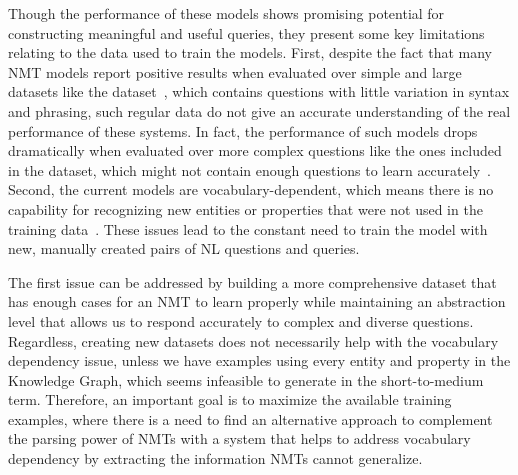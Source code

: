 Though the performance of these models shows promising potential for constructing meaningful 
and useful \SPARQL{} queries, they present some key limitations relating to the data 
used to train the models. First, despite the fact that many NMT models report positive results 
when evaluated over simple and large datasets like the \DBNQA{} dataset~\cite{nmt:nl-to-sparql-Yin19}, 
which contains questions with little variation in syntax and phrasing, such regular data do not give 
an accurate understanding of the real performance of these systems. In fact, the performance of such 
models drops dramatically when evaluated over more complex questions like the ones included in the 
\LCQuADone{} dataset, which might not contain enough questions to learn 
accurately~\cite{nmt:nl-to-sparql-Yin19}. Second, the current models are vocabulary-dependent, which 
means there is no capability for recognizing new entities or properties that were not used in the 
training data~\cite{nmt:nl-to-sparql-Yin19}. These issues lead to the constant need to train the model 
with new, manually created pairs of NL questions and \SPARQL{} queries.

The first issue can be addressed by building a more comprehensive dataset that has enough 
cases for an NMT to learn properly while maintaining an abstraction level that allows us to 
respond accurately to complex and diverse questions. Regardless, creating new datasets does 
not necessarily help with the vocabulary dependency issue, unless we have examples using 
every entity and property in the Knowledge Graph, which seems infeasible to generate in the 
short-to-medium term. Therefore, an important goal is to maximize the available training examples, 
where there is a need to find an alternative approach to complement the parsing power 
of NMTs with a system that helps to address vocabulary dependency by extracting the 
information NMTs cannot generalize.


